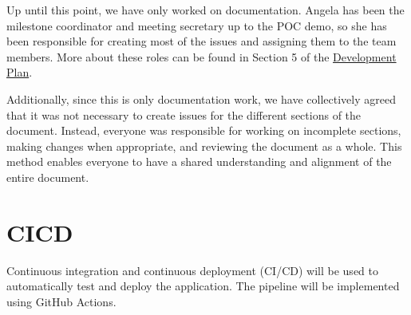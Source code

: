 \documentclass{article}
\begin{document}
Up until this point, we have only worked on documentation. Angela has been the
milestone coordinator and meeting secretary up to the POC demo, so she has been
responsible for creating most of the issues and assigning them to the team
members. More about these roles can be found in Section 5 of the
\href{https://github.com/PlutosCapstone/Plutos/blob/main/docs/DevelopmentPlan/DevelopmentPlan.pdf}{Development
Plan}.

Additionally, since this is only documentation work, we have collectively agreed
that it was not necessary to create issues for the different sections of the
document. Instead, everyone was responsible for working on incomplete sections,
making changes when appropriate, and reviewing the document as a whole. This
method enables everyone to have a shared understanding and alignment of the
entire document.

\section{CICD}

Continuous integration and continuous deployment (CI/CD) will be used to
automatically test and deploy the application. The pipeline will be implemented
using GitHub Actions.
\end{document}
